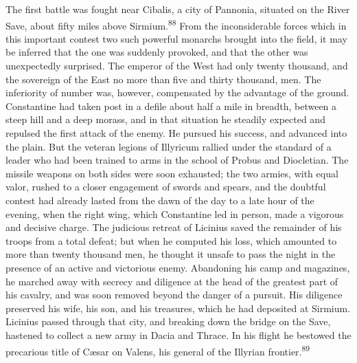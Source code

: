 
The first battle was fought near Cibalis, a city of Pannonia,
situated on the River Save, about fifty miles above Sirmium.\textsuperscript{88}
From the inconsiderable forces which in this important contest
two such powerful monarchs brought into the field, it may be
inferred that the one was suddenly provoked, and that the other
was unexpectedly surprised. The emperor of the West had only
twenty thousand, and the sovereign of the East no more than five
and thirty thousand, men. The inferiority of number was, however,
compensated by the advantage of the ground. Constantine had taken
post in a defile about half a mile in breadth, between a steep
hill and a deep morass, and in that situation he steadily
expected and repulsed the first attack of the enemy. He pursued
his success, and advanced into the plain. But the veteran legions
of Illyricum rallied under the standard of a leader who had been
trained to arms in the school of Probus and Diocletian. The
missile weapons on both sides were soon exhausted; the two
armies, with equal valor, rushed to a closer engagement of swords
and spears, and the doubtful contest had already lasted from the
dawn of the day to a late hour of the evening, when the right
wing, which Constantine led in person, made a vigorous and
decisive charge. The judicious retreat of Licinius saved the
remainder of his troops from a total defeat; but when he computed
his loss, which amounted to more than twenty thousand men, he
thought it unsafe to pass the night in the presence of an active
and victorious enemy. Abandoning his camp and magazines, he
marched away with secrecy and diligence at the head of the
greatest part of his cavalry, and was soon removed beyond the
danger of a pursuit. His diligence preserved his wife, his son,
and his treasures, which he had deposited at Sirmium. Licinius
passed through that city, and breaking down the bridge on the
Save, hastened to collect a new army in Dacia and Thrace. In his
flight he bestowed the precarious title of Cæsar on Valens, his
general of the Illyrian frontier.\textsuperscript{89}


